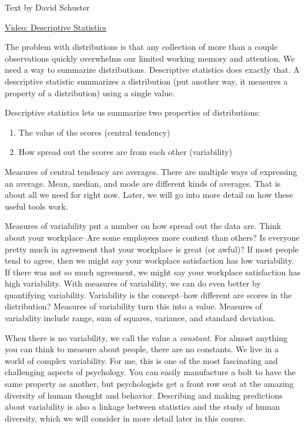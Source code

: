 \documentclass[
]{book}
\providecommand{\tightlist}{%
  \setlength{\itemsep}{0pt}\setlength{\parskip}{0pt}}
\begin{document}
Text by David Schuster

\href{https://youtu.be/kh3dyECZFBE}{Video: Descriptive Statistics}

The problem with distributions is that any collection of more than a couple observations quickly overwhelms our limited working memory and attention. We need a way to summarize distributions. Descriptive statistics does exactly that. A descriptive statistic summarizes a distribution (put another way, it measures a property of a distribution) using a single value.

Descriptive statistics lets us summarize two properties of distributions:

\begin{enumerate}
\def\labelenumi{\arabic{enumi}.}
\tightlist
\item
  The value of the scores (central tendency)
\item
  How spread out the scores are from each other (variability)
\end{enumerate}

Measures of central tendency are averages. There are multiple ways of expressing an average. Mean, median, and mode are different kinds of averages. That is about all we need for right now. Later, we will go into more detail on how these useful tools work.

Measures of variability put a number on how spread out the data are. Think about your workplace--Are some employees more content than others? Is everyone pretty much in agreement that your workplace is great (or awful)? If most people tend to agree, then we might say your workplace satisfaction has low variability. If there was not so much agreement, we might say your workplace satisfaction has high variability. With measures of variability, we can do even better by quantifying variability. Variability is the concept--how different are scores in the distribution? Measures of variability turn this into a value. Measures of variability include range, sum of squares, variance, and standard deviation.

When there is no variability, we call the value a \emph{constant}. For almost anything you can think to measure about people, there are no constants. We live in a world of complex variability. For me, this is one of the most fascinating and challenging aspects of psychology. You can easily manufacture a bolt to have the same property as another, but psychologists get a front row seat at the amazing diversity of human thought and behavior. Describing and making predictions about variability is also a linkage between statistics and the study of human diversity, which we will consider in more detail later in this course.
\end{document}
